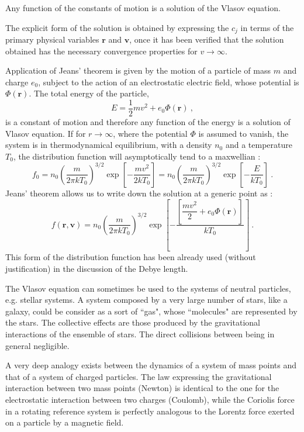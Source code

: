 \documentclass[12pt,a4paper]{article}
\renewcommand{\vec}[1]{\boldsymbol{#1}}
\newcounter{theo}[section]\setcounter{theo}{0}
\begin{document}
\begin{tcolorbox}[colback=green!15,colframe=green!40!black,title=Jeans theorem]
Any function of the constants of motion is a solution of the Vlasov equation.
\end{tcolorbox}
The explicit form of the solution is obtained by expressing the $c_j$ in terms of the primary physical variables $\vec{r}$ and $\vec{v}$, once it has been verified that the solution obtained has the necessary convergence properties for $v \rightarrow \infty$. 

Application of Jeans' theorem is given by the motion of a particle of mass $m$ and charge $e_0$, subject to the action of an electrostatic electric field, whose potential is $\Phi(\vec{r})$. The total energy of the particle,
\begin{equation*}
E = \frac{1}{2}m v^2 +e_0 \Phi(\vec{r}) ~,
\end{equation*}
is a constant of motion and therefore any function of the energy is a solution of Vlasov equation. If for $r \rightarrow \infty$, where the potential $\Phi$ is assumed to vanish, the system is in thermodynamical equilibrium, with a density $n_0$ and a temperature $T_0$, the distribution function will asymptotically tend to a maxwellian :
\begin{equation*}
f_0 = n_0 \left(\frac{m}{2\pi kT_0} \right)^{3/2} \exp\left[-\frac{mv^2}{2kT_0} \right] = n_0  \left(\frac{m}{2\pi kT_0} \right)^{3/2} \exp\left[-\frac{E}{kT_0} \right] ~.
\end{equation*}
Jeans’ theorem allows us to write down the solution at a generic point as : 
\begin{equation*}
f(\vec{r}, \vec{v}) = n_0 \left(\frac{m}{2\pi kT_0} \right)^{3/2} \exp\left[-\dfrac{\left[ \dfrac{mv^2}{2} +e_0 \Phi(\vec{r}) \right]}{kT_0} \right] ~.
\end{equation*}
This form of the distribution function has been already used (without justification) in the discussion of the Debye length.

The Vlasov equation can sometimes be used to the systems of neutral particles, e.g. stellar systems. A system composed by a very large number of stars, like a galaxy, could be consider as a sort of ``gas", whose ``molecules" are represented by the stars. The collective effects are those produced by the gravitational interactions of the ensemble of stars. The direct collisions between being in general negligible. 

A very deep analogy exists between the dynamics of a system of mass points and that of a system of charged particles. The law expressing the gravitational interaction between two mass points (Newton) is identical to the one for the electrostatic interaction between two charges (Coulomb), while the Coriolis force in a rotating reference system is perfectly analogous to the Lorentz force exerted on a particle by a magnetic field. 
\end{document}
